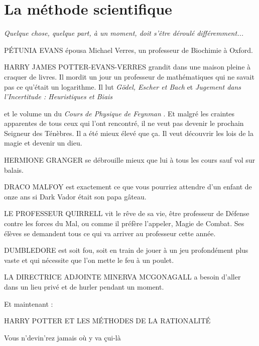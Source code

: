 
\chapter{La méthode scientifique}


\begin{center}\emph{Quelque chose, quelque part, à un moment, doit s'être déroulé différemment...} \end{center}


PÉTUNIA EVANS épousa Michael Verres, un professeur de Biochimie à Oxford.

HARRY JAMES POTTER-EVANS-VERRES grandit dans une maison pleine à craquer de livres. Il mordit un jour un professeur de mathématiques qui ne savait pas ce qu'était un logarithme. Il lut \emph{Gödel, Escher et Bach}  et \emph{Jugement dans l'Incertitude : Heuristiques et Biais} 

et le volume un du \emph{Cours de Physique de Feynman} . Et malgré les craintes apparentes de tous ceux qui l'ont rencontré, il ne veut pas devenir le prochain Seigneur des Ténèbres. Il a été mieux élevé que ça. Il veut découvrir les lois de la magie et devenir un dieu.

HERMIONE GRANGER se débrouille mieux que lui à tous les cours sauf vol sur balais.

DRACO MALFOY est exactement ce que vous pourriez attendre d'un enfant de onze ans si Dark Vador était son papa gâteau.

LE PROFESSEUR QUIRRELL vit le rêve de sa vie, être professeur de Défense contre les forces du Mal, ou comme il préfère l'appeler, Magie de Combat. Ses élèves se demandent tous ce qui va arriver au professeur cette année.

DUMBLEDORE est soit fou, soit en train de jouer à un jeu profondément plus vaste et qui nécessite que l'on mette le feu à un poulet.

LA DIRECTRICE ADJOINTE MINERVA MCGONAGALL a besoin d'aller dans un lieu privé et de hurler pendant un moment.


\begin{center}Et maintenant :\end{center}



\begin{center}HARRY POTTER ET LES MÉTHODES DE LA RATIONALITÉ\end{center}



\begin{center}Vous n'devin'rez jamais où y va çui-là\end{center}

